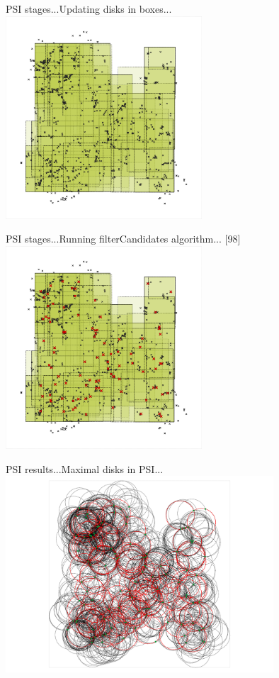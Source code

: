 \documentclass{beamer}
\begin{document}
\begin{frame}{PSI stages...}{Updating disks in boxes...}
    \centering
    \includegraphics[width=0.55\textwidth]{figures/psi5}
\end{frame}

\begin{frame}{PSI stages...}{Running filterCandidates algorithm... [98]}
    \centering
    \includegraphics[width=0.55\textwidth]{figures/psi6}
\end{frame}

\begin{frame}{PSI results...}{Maximal disks in PSI...}
    \centering
    \includegraphics[width=0.75\textwidth]{figures/psi7}
\end{frame}
\end{document}
